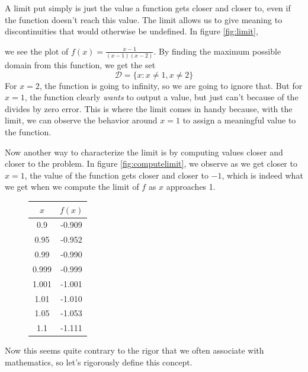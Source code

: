 A limit put simply is just the value a function gets closer and closer to, even if the function doesn't reach this value. The limit allows us to give meaning to discontinuities that would otherwise be undefined. In figure \eqref{fig:limit},
\begin{figure}[h]
	\centering
	\caption{}
	\label{fig:limit}
\end{figure}
we see the plot of $f(x)=\frac{x-1}{(x-1)(x-2)}$. By finding the maximum possible domain from this function, we get the set
$$\mathcal{D}=\{x:x\neq1,x\neq 2\}$$
For $x=2$, the function is going to infinity, so we are going to ignore that. But for $x=1$, the function clearly \textit{wants} to output a value, but just can't because of the divides by zero error.
This is where the limit comes in handy because, with the limit, we can observe the behavior around $x=1$ to assign a meaningful value to the function.

Now another way to characterize the limit is by computing values closer and closer to the problem. 
In figure \eqref{fig:computelimit}, we observe as we get closer to $x=1$, the value of the function gets closer and closer to $-1$, which is indeed what we get when we compute the limit of $f$ as $x$ approaches 1.
\begin{figure}[h]
	\centering
	\begin{tabular}{ |c|c| }
		\hline
		$x$ & $f(x)$ \\
		\hline
		0.9 & -0.909 \\
		0.95 & -0.952\\
		0.99 & -0.990 \\
		0.999 & -0.999 \\
		\hline
		\hline
		1.001 & -1.001 \\
		1.01 & -1.010 \\
		1.05 & -1.053 \\
		1.1 & -1.111 \\
		\hline
	\end{tabular}
	\caption{}
	\label{fig:computelimit}
\end{figure} 
Now this seems quite contrary to the rigor that we often associate with mathematics, so let's rigorously define this concept.

